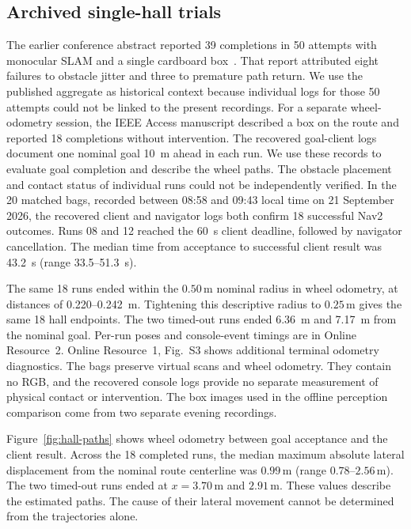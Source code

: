 \documentclass[pdflatex,sn-mathphys-num]{sn-jnl}
\newcommand{\m}{\,\mathrm{m}}
\begin{document}
\subsection{Archived single-hall trials}\label{sec:archived-hall}

The earlier conference abstract reported 39 completions in 50 attempts with monocular SLAM and a single cardboard box~\cite{lee2026iccas}. That report attributed eight failures to obstacle jitter and three to premature path return. We use the published aggregate as historical context because individual logs for those 50 attempts could not be linked to the present recordings. For a separate wheel-odometry session, the IEEE Access manuscript described a box on the route and reported 18 completions without intervention. The recovered goal-client logs document one nominal goal 10~m ahead in each run. We use these records to evaluate goal completion and describe the wheel paths. The obstacle placement and contact status of individual runs could not be independently verified. In the 20 matched bags, recorded between 08:58 and 09:43 local time on 21 September 2026, the recovered client and navigator logs both confirm 18 successful Nav2 outcomes. Runs 08 and 12 reached the 60~s client deadline, followed by navigator cancellation. The median time from acceptance to successful client result was 43.2~s (range 33.5--51.3~s).

The same 18 runs ended within the $0.50\m$ nominal radius in wheel odometry, at distances of 0.220--0.242~m. Tightening this descriptive radius to $0.25\m$ gives the same 18 hall endpoints. The two timed-out runs ended 6.36~m and 7.17~m from the nominal goal. Per-run poses and console-event timings are in Online Resource~2. Online Resource~1, Fig.~S3 shows additional terminal odometry diagnostics. The bags preserve virtual scans and wheel odometry. They contain no RGB, and the recovered console logs provide no separate measurement of physical contact or intervention. The box images used in the offline perception comparison come from two separate evening recordings.

Figure~\ref{fig:hall-paths} shows wheel odometry between goal acceptance and the client result. Across the 18 completed runs, the median maximum absolute lateral displacement from the nominal route centerline was $0.99\m$ (range $0.78$--$2.56\m$). The two timed-out runs ended at $x=3.70\m$ and $2.91\m$. These values describe the estimated paths. The cause of their lateral movement cannot be determined from the trajectories alone.
\end{document}
